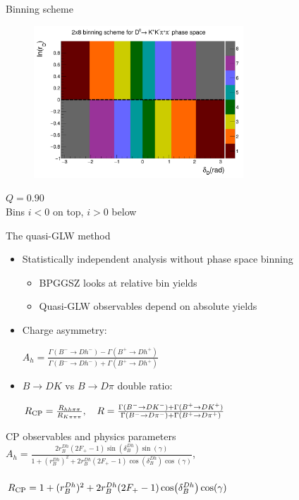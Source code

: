 \documentclass{beamer}
\begin{document}
\begin{frame}{Binning scheme}
  \begin{figure}
    \centering
    \includegraphics[width = 0.7\textwidth]{Plots/BinningSchemePlot_8Bins.png}
  \end{figure}
  \vspace{-1.0cm}
  \begin{center}
    $Q = 0.90$ \\
    Bins $i < 0$ on top, $i > 0$ below
  \end{center}
\end{frame}

\begin{frame}{The quasi-GLW method}
  \begin{itemize}
    \setlength\itemsep{0.5em}
    \item{Statistically independent analysis without phase space binning}
    \begin{itemize}
      \item{BPGGSZ looks at relative bin yields}
      \item{Quasi-GLW observables depend on absolute yields}
    \end{itemize}
    \item{Charge asymmetry:}
    \begin{center}
      $A_h = \frac{\Gamma(B^-\to D h^-) - \Gamma(B^+\to D h^+)}{\Gamma(B^-\to D h^-) + \Gamma(B^+\to D h^+)}$
    \end{center}
    \item{$B\to DK$ vs $B\to D\pi$ double ratio:}
    \begin{center}
      $R_{\rm CP} = \frac{R_{hh\pi\pi}}{R_{K\pi\pi\pi}}, \quad R = \frac{\Gamma(B^-\to D K^-) + \Gamma(B^+\to D K^+)}{\Gamma(B^-\to D\pi^-) + \Gamma(B^+\to D\pi^+)}$
    \end{center}
  \end{itemize}
  \begin{block}{CP observables and physics parameters}
    $A_h = \frac{2r_B^{Dh}(2F_+ - 1)\sin(\delta_B^{Dh})\sin(\gamma)}{1 + (r_B^{Dh})^2 + 2r_B^{Dh}(2F_+ - 1)\cos(\delta_B^{Dh})\cos(\gamma)}$, \\~\\
    $R_{\rm CP} = 1 + (r_B^{Dh})^2 + 2r_B^{Dh}(2F_+ - 1)\cos(\delta_B^{Dh})\cos(\gamma)$
  \end{block}
\end{frame}
\end{document}
